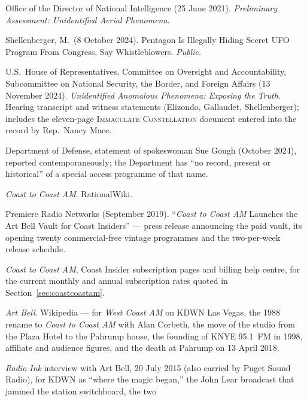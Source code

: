 \begin{srcnotes}
\item Office of the Director of National Intelligence (25 June 2021). \emph{Preliminary Assessment:
Unidentified Aerial Phenomena}.
\item Shellenberger, M.\ (8 October 2024). Pentagon Is Illegally Hiding Secret UFO Program From
Congress, Say Whistleblowers. \emph{Public}. 
\item U.S.\ House of Representatives, Committee on Oversight and Accountability, Subcommittee on
National Security, the Border, and Foreign Affairs (13 November 2024). \emph{Unidentified Anomalous
Phenomena: Exposing the Truth}. Hearing transcript and witness statements (Elizondo, Gallaudet,
Shellenberger); includes the eleven-page \textsc{Immaculate Constellation} document entered into the
record by Rep.\ Nancy Mace.
\item Department of Defense, statement of spokeswoman Sue Gough (October 2024), reported
contemporaneously; the Department has ``no record, present or historical'' of a special access programme
of that name.
\item \emph{Coast to Coast AM}. RationalWiki. 
\item Premiere Radio Networks (September 2019). ``\emph{Coast to Coast AM} Launches the Art Bell Vault
for Coast Insiders'' --- press release announcing the paid vault, its opening twenty commercial-free
vintage programmes and the two-per-week release schedule.
\item \emph{Coast to Coast AM}, Coast Insider subscription pages and billing help centre, for the
current monthly and annual subscription rates quoted in Section~\ref{sec:coastcoastam}.
\item \emph{Art Bell}. Wikipedia --- for \emph{West Coast AM} on KDWN Las Vegas, the 1988 rename to
\emph{Coast to Coast AM} with Alan Corbeth, the move of the studio from the Plaza Hotel to the Pahrump
house, the founding of KNYE 95.1~FM in 1998, affiliate and audience figures, and the death at Pahrump on
13 April 2018. 
\item \emph{Radio Ink} interview with Art Bell, 20 July 2015 (also carried by Puget Sound Radio), for
KDWN as ``where the magic began,'' the John Lear broadcast that jammed the station switchboard, the two

\end{srcnotes}
